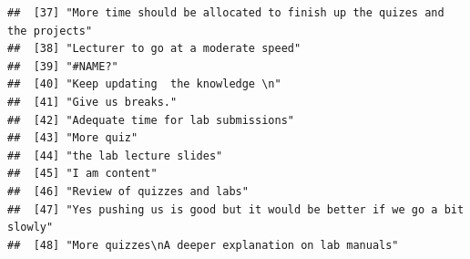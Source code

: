\documentclass[
]{article}
\begin{document}
\begin{verbatim}
##  [37] "More time should be allocated to finish up the quizes and the projects"                                                                                                                                                
##  [38] "Lecturer to go at a moderate speed"                                                                                                                                                                                    
##  [39] "#NAME?"                                                                                                                                                                                                                
##  [40] "Keep updating  the knowledge \n"                                                                                                                                                                                       
##  [41] "Give us breaks."                                                                                                                                                                                                       
##  [42] "Adequate time for lab submissions"                                                                                                                                                                                     
##  [43] "More quiz"                                                                                                                                                                                                             
##  [44] "the lab lecture slides"                                                                                                                                                                                                
##  [45] "I am content"                                                                                                                                                                                                          
##  [46] "Review of quizzes and labs"                                                                                                                                                                                            
##  [47] "Yes pushing us is good but it would be better if we go a bit slowly"                                                                                                                                                   
##  [48] "More quizzes\nA deeper explanation on lab manuals"                                                                                                                                                                     

\end{verbatim}
\end{document}

